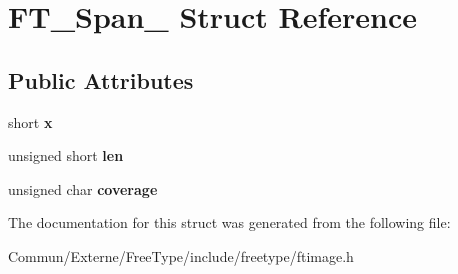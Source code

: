 \hypertarget{struct_f_t___span__}{}\section{F\+T\+\_\+\+Span\+\_\+ Struct Reference}
\label{struct_f_t___span__}
\subsection*{Public Attributes}
\begin{DoxyCompactItemize}
\item 
short {\bfseries x}\hypertarget{struct_f_t___span___a7f7235a404c66398b49c50fa09691ba5}{}\label{struct_f_t___span___a7f7235a404c66398b49c50fa09691ba5}

\item 
unsigned short {\bfseries len}\hypertarget{struct_f_t___span___a939c84317f25a97d0ba01704591a4d38}{}\label{struct_f_t___span___a939c84317f25a97d0ba01704591a4d38}

\item 
unsigned char {\bfseries coverage}\hypertarget{struct_f_t___span___a70f9c9e0e8d3f0b38adee03a508ae214}{}\label{struct_f_t___span___a70f9c9e0e8d3f0b38adee03a508ae214}

\end{DoxyCompactItemize}


The documentation for this struct was generated from the following file\+:\begin{DoxyCompactItemize}
\item 
Commun/\+Externe/\+Free\+Type/include/freetype/ftimage.\+h\end{DoxyCompactItemize}
